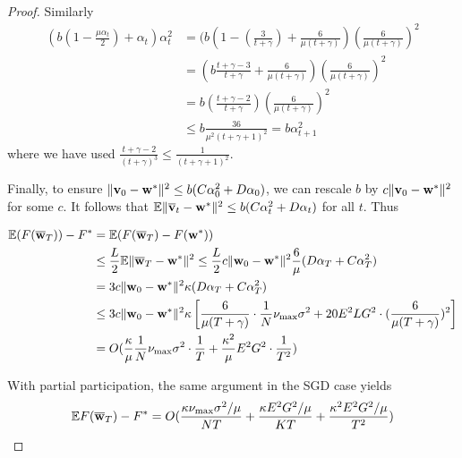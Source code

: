 \begin{proof}
Similarly 
\begin{align*}
(b(1-\frac{\mu\alpha_{t}}{2})+\alpha_{t})\alpha_{t}^{2} & =(b(1-(\frac{3}{t+\gamma})+\frac{6}{\mu(t+\gamma)})(\frac{6}{\mu(t+\gamma)})^{2}\\
& =(b\frac{t+\gamma-3}{t+\gamma}+\frac{6}{\mu(t+\gamma)})(\frac{6}{\mu(t+\gamma)})^{2}\\
& =b(\frac{t+\gamma-2}{t+\gamma})(\frac{6}{\mu(t+\gamma)})^{2}\\
& \leq b\frac{36}{\mu^{2}(t+\gamma+1)^{2}}=b\alpha_{t+1}^{2}
\end{align*}
where we have used $\frac{t+\gamma-2}{(t+\gamma)^{3}}\leq\frac{1}{(t+\gamma+1)^{2}}$.

Finally, to ensure $\|{\mathbf{v}}_{0}-{\mathbf{w}}^{\ast}\|^{2}\leq b(C\alpha_{0}^{2}+D\alpha_{0})$,
we can rescale $b$ by $c\|{\mathbf{v}}_{0}-{\mathbf{w}}^{\ast}\|^{2}$ for some $c.$ It
follows that $\mathbb{E}\|{\overline{\mathbf{v}}}_{t}-{\mathbf{w}}^{\ast}\|^{2}\leq b(C\alpha_{t}^{2}+D\alpha_{t})$
for all $t$. Thus 

\begin{align*}
\mathbb{E}(F({\overline{\mathbf{w}}}_{T}))-F^{\ast} & =\mathbb{E}(F({\overline{\mathbf{w}}}_{T})-F({\mathbf{w}}^{\ast}))\\
& \leq\frac{L}{2}\mathbb{E}\|{\overline{\mathbf{w}}}_{T}-{\mathbf{w}}^{\ast}\|^{2}\leq\frac{L}{2}c\|{\mathbf{w}}_{0}-{\mathbf{w}}^{\ast}\|^{2}\frac{6}{\mu}(D\alpha_{T}+C\alpha_{T}^{2})\\
& =3c\|{\mathbf{w}}_{0}-{\mathbf{w}}^{\ast}\|^{2}\kappa(D\alpha_{T}+C\alpha_{T}^{2})\\
& \leq3c\|{\mathbf{w}}_{0}-{\mathbf{w}}^{\ast}\|^{2}\kappa\left[\frac{6}{\mu(T+\gamma)}\cdot\frac{1}{N}\nu_{\max}\sigma^{2}+20E^{2}LG^{2}\cdot(\frac{6}{\mu(T+\gamma)})^{2}\right]\\
& =O(\frac{\kappa}{\mu}\frac{1}{N}\nu_{\max}\sigma^{2}\cdot\frac{1}{T}+\frac{\kappa^{2}}{\mu}E^{2}G^{2}\cdot\frac{1}{T^{2}})
\end{align*}

With partial participation, the same argument in the SGD case yields
\begin{align*}
\mathbb{E}F({\overline{\mathbf{w}}}_{T})-F^{\ast}=O(\frac{\kappa\nu_{\max}\sigma^{2}/\mu}{NT}+\frac{\kappa E^{2}G^{2}/\mu}{KT}+\frac{\kappa^{2}E^{2}G^{2}/\mu}{T^{2}})
\end{align*}
\end{proof}